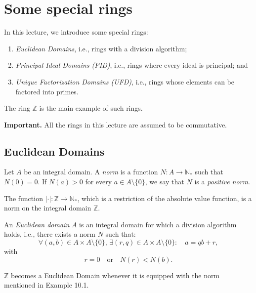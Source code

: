 \documentclass[11pt,a4paper]{article}
\begin{document}
\def\contador{Lesson 13}


\section{Some special rings}

In this lecture, we introduce some special rings:
\begin{enumerate}[label=(\roman*)]
    \item \textit{Euclidean Domains}, i.e., rings with a division algorithm;
    \item \textit{Principal Ideal Domains (PID)}, i.e., rings where every ideal is principal; and
    \item \textit{Unique Factorization Domains (UFD)}, i.e., rings whose elements can be factored into primes.
\end{enumerate}

The ring $\mathbb{Z}$ is the main example of such rings.

\textbf{Important.} All the rings in this lecture are assumed to be commutative.

\subsection{Euclidean Domains}

Let $A$ be an integral domain. A \textit{norm} is a function $N : A \to \mathbb{N}_*$ such that $N(0) = 0$. If $N(a) > 0$ for every $a \in A \setminus \{0\}$, we say that $N$ is a \textit{positive norm}.

\begin{exa}[10.1]
The function $|\cdot| : \mathbb{Z} \to \mathbb{N}_*$, which is a restriction of the absolute value function, is a norm on the integral domain $\mathbb{Z}$.
\end{exa}

An \textit{Euclidean domain} $A$ is an integral domain for which a division algorithm holds, i.e., there exists a norm $N$ such that:
\[
\forall (a,b) \in A \times A \setminus \{0\}, \, \exists (r,q) \in A \times A \setminus \{0\} : \quad a = qb + r,
\]
with
\[
r = 0 \quad \text{or} \quad N(r) < N(b).
\]

\begin{exa}
$\mathbb{Z}$ becomes a Euclidean Domain whenever it is equipped with the norm mentioned in Example 10.1.
\end{exa}
\end{document}
